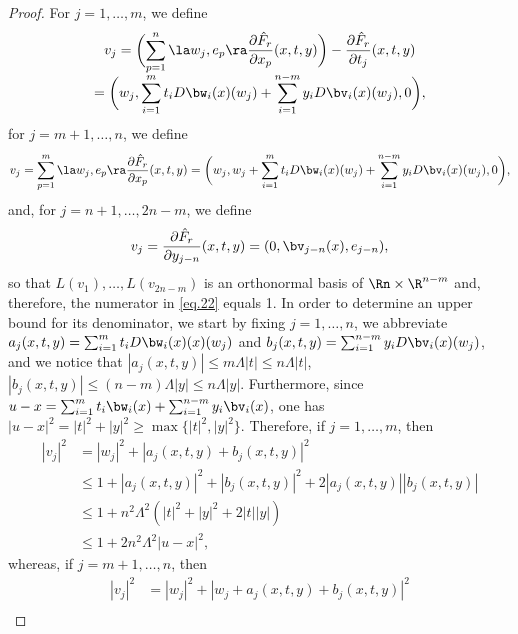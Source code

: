 \begin{proof}
For $j=1,\ldots,m$, we define\vspace*{-3pt}
\begin{multline*}
v_j = \biggl(\sum_{p=1}^n \la w_j, e_p \ra \frac{\partial \hat{F}_r}{\partial x_p}(x,t,y)\biggr) - \frac{\partial \hat{F}_r}{\partial t_j}(x,t,y)
\\[-5pt]
= \biggl(w_j, \sum_{i=1}^m t_i D\bw_i(x)(w_j) + \sum_{i=1}^{n-m} y_i D\bv_i(x)(w_j), 0 \biggr),
\end{multline*}
for $j=m+1,\ldots,n$, we define
\begin{equation*}
v_j = \sum_{p=1}^m \la w_j, e_p \ra \frac{\partial \hat{F}_r}{\partial x_p}(x,t,y)
= \biggl(w_j, w_j + \sum_{i=1}^m t_i D\bw_i(x)(w_j) + \sum_{i=1}^{n-m} y_i D\bv_i(x)(w_j), 0 \biggr),
\end{equation*}
and, for $j=n+1,\ldots,2n-m$, we define\vspace*{-3pt}
\begin{equation*}
v_j = \frac{\partial \hat{F}_r}{\partial y_{j-n}}(x,t,y) = (0, \bv_{j-n}(x),e_{j-n}),
\end{equation*}
so that $L(v_1),\ldots,L(v_{2n-m})$ is an orthonormal basis of $\Rn \times \R^{n-m}$ and, therefore, the numerator in \eqref{eq.22} equals 1.
In order to determine an upper bound for its denominator, we start by fixing $j=1,\ldots,n$, we abbreviate $a_j(x,t,y) = \sum_{i=1}^m t_i D\bw_i(x)(x)(w_j)$ and $b_j(x,t,y) = \sum_{i=1}^{n-m} y_i D\bv_i(x)(w_j)$, and we notice that $|a_j(x,t,y)| \leq m \Lambda |t| \leq n \Lambda |t|$, $|b_j(x,t,y)| \leq (n-m) \Lambda |y| \leq n \Lambda |y|$.
Furthermore, since $u - x = \sum_{i=1}^m t_i \bw_i(x) + \sum_{i=1}^{n-m} y_i \bv_i(x)$, one has $|u-x|^2 = |t|^2 + |y|^2 \geq \max \{|t|^2,|y|^2\}$.
Therefore, if $j=1,\ldots,m$, then
\begin{equation*}
\begin{split}
|v_j|^2 & = |w_j|^2 + \left| a_j(x,t,y) + b_j(x,t,y) \right|^2 \\
& \leq 1 + \left|a_j(x,t,y)\right|^2 + \left|b_j(x,t,y)\right|^2 + 2 \left|a_j(x,t,y)\right| \left|b_j(x,t,y)\right| \\
& \leq 1 + n^2 \Lambda^2 \left(|t|^2 + |y|^2 + 2 |t| |y|\right) \\
& \leq 1 + 2 n^2 \Lambda^2 |u-x|^2,
\end{split}
\end{equation*}
whereas, if $j=m+1,\ldots,n$, then
\begin{equation*}
\begin{split}
\left| v_j\right|^2 &= |w_j|^2 + |w_j + a_j(x,t,y) + b_j(x,t,y)|^2 \\

\end{split}
\end{equation*}
\end{proof}
